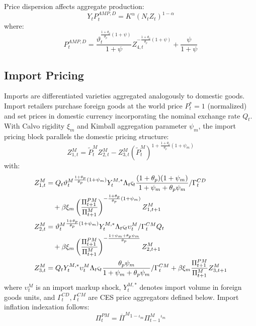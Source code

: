 \documentclass[12pt]{article}
\begin{document}
Price dispersion affects aggregate production:
\begin{equation}\label{eq:production}
Y_t P_t^{AMP,D} = K^\alpha (N_t Z_t)^{1-\alpha}
\end{equation}
where:
\begin{equation}
P_t^{AMP,D} = \frac{\vartheta_t^{\frac{1+\theta_p}{\theta_p}(1+\psi)}}{1+\psi} Z_{4,t}^{-\frac{1+\theta_p}{\theta_p}(1+\psi)} + \frac{\psi}{1+\psi}
\end{equation}

\subsection{Import Pricing}

Imports are differentiated varieties aggregated analogously to domestic goods. Import retailers purchase foreign goods at the world price $P_t^* = 1$ (normalized) and set prices in domestic currency incorporating the nominal exchange rate $Q_t$. With Calvo rigidity $\xi_m$ and Kimball aggregation parameter $\psi_m$, the import pricing block parallels the domestic pricing structure:
\begin{equation}
Z_{1,t}^M = \tilde{P}_t^M Z_{2,t}^M - Z_{3,t}^M (\tilde{P}_t^M)^{1 + \frac{1+\theta_p}{\theta_p}(1+\psi_m)}
\end{equation}
with:
\begin{align}
Z_{1,t}^M &= Q_t \vartheta_t^M {}^{\frac{1+\theta_p}{\theta_p}(1+\psi_m)} Y_t^{M,*} \Lambda_t \varsigma_t \frac{(1+\theta_p)(1+\psi_m)}{1+\psi_m+\theta_p\psi_m} / \Gamma_t^{CD} \notag \\
&\quad + \beta \xi_m \left( \frac{\Pi_{t+1}^{PM}}{\Pi_{t+1}^M} \right)^{-\frac{1+\theta_p}{\theta_p}(1+\psi_m)} Z_{1,t+1}^M \\
Z_{2,t}^M &= \vartheta_t^M {}^{\frac{1+\theta_p}{\theta_p}(1+\psi_m)} Y_t^{M,*} \Lambda_t \varsigma_t \upsilon_t^M / \Gamma_t^{CM} Q_t \notag \\
&\quad + \beta \xi_m \left( \frac{\Pi_{t+1}^{PM}}{\Pi_{t+1}^M} \right)^{-\frac{1+\psi_m+\theta_p\psi_m}{\theta_p}} Z_{2,t+1}^M \\
Z_{3,t}^M &= Q_t Y_t^{M,*} \upsilon_t^M \Lambda_t \varsigma_t \frac{\theta_p \psi_m}{1+\psi_m+\theta_p\psi_m} / \Gamma_t^{CM} + \beta \xi_m \frac{\Pi_{t+1}^{PM}}{\Pi_{t+1}^M} Z_{3,t+1}^M
\end{align}
where $\upsilon_t^M$ is an import markup shock, $Y_t^{M,*}$ denotes import volume in foreign goods units, and $\Gamma_t^{CD}, \Gamma_t^{CM}$ are CES price aggregators defined below. Import inflation indexation follows:
\begin{equation}
\Pi_t^{PM} = \overline{\Pi}^M {}^{1-\iota_m} \Pi_{t-1}^M {}^{\iota_m}
\end{equation}
\end{document}
